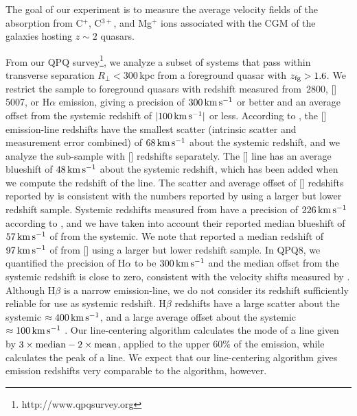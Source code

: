 \documentclass[iop]{emulateapj}
\begin{document}
The goal of our experiment is to measure the average velocity fields of the absorption from C$^+$,
C$^{3+}$, and Mg$^+$ ions associated with the CGM of the galaxies hosting $z\sim 2$ quasars.

From our QPQ survey\footnote{http://www.qpqsurvey.org}, we analyze a subset of systems that
pass within transverse separation $R_\perp<300$\,kpc from a foreground quasar with
$z_{\rm fg} > 1.6$. We restrict the sample to foreground quasars with redshift measured from
\,2800, []\,5007, or H$\alpha$ emission, giving a precision of
$300\,{\rm km\,s^{-1}}$ or better and an average offset from the systemic redshift of
$|100\,{\rm km\,s^{-1}}|$ or less. According to \cite{Shen+16}, the [] emission-line
redshifts have the smallest scatter (intrinsic scatter and measurement error combined) of
$68\,{\rm km\,s^{-1}}$ about the systemic redshift, and we analyze the sub-sample with
[] redshifts separately. The [] line has an average blueshift of
$48\,{\rm km\,s^{-1}}$ about the systemic redshift, which has been added when we compute the
redshift of the line. The scatter and average offset of [] redshifts reported by
\cite{Shen+16} is consistent with the numbers reported by \cite{Boroson05} using a larger but
lower redshift sample. Systemic redshifts measured from  have a precision of
$226\,{\rm km\,s^{-1}}$ according to \cite{Shen+16}, and we have taken into account their
reported median blueshift of $57\,{\rm km\,s^{-1}}$ of  from the systemic. We note that
\cite{Richards+02} reported a median redshift of $97\,{\rm km\,s^{-1}}$ of  from
[] using a larger but lower redshift sample. In QPQ8, we quantified
the precision of H$\alpha$ to be $300\,{\rm km\,s^{-1}}$ and the median offset from the systemic
redshift is close to zero, consistent with the velocity shifts measured by \cite{Shen+11}.
Although H$\beta$ is a narrow emission-line, we do not consider its redshift sufficiently reliable
for use as systemic redshift. H$\beta$ redshifts have a large scatter about the systemic
$\approx400\,{\rm km\,s^{-1}}$, and a large average offset about the systemic
$\approx100\,{\rm km\,s^{-1}}$ \citep[][QPQ8]{Shen+16}.
Our line-centering algorithm calculates the mode of a line given by
$3\times{\rm median}-2\times{\rm mean}$, applied to the upper 60\% of the emission, while
\cite{Shen+16} calculates the peak of a line. We expect that our line-centering algorithm gives
emission redshifts very comparable to the \cite{Shen+16} algorithm, however. \cite{Shen+16}
\end{document}
